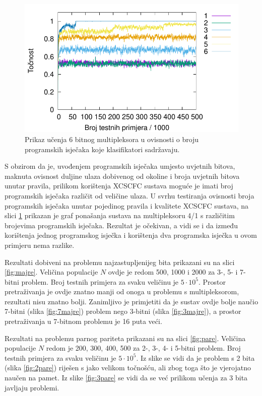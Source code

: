 \documentclass[times, utf8, zavrsni]{fer}
\begin{document}
\begin{figure}[!h]
    \centering
    \includegraphics[width=12cm]{img/mux_cond/6bitcond.pdf}
    \caption{Prikaz učenja 6 bitnog multipleksora u ovisnosti o broju programskih isječaka koje klasifikatori sadržavaju.}
    \label{img:6bitcond}
\end{figure}
S obzirom da je, uvođenjem programskih isječaka umjesto uvjetnih bitova, maknuta ovisnost duljine ulaza dobivenog od okoline i broja uvjetnih bitova unutar pravila, prilikom korištenja XCSCFC sustava moguće je imati broj programskih isječaka različit od veličine ulaza.
U svrhu testiranja ovisnosti broja programskih isječaka unutar pojedinog pravila i kvalitete XCSCFC sustava, na slici \ref{img:6bitcond} prikazan je graf ponašanja sustava na multipleksoru 4/1 s različitim brojevima programskih isječaka.
Rezultat je očekivan, a vidi se i da između korištenja jednog programskog isječka i korištenja dva programska isječka u ovom primjeru nema razlike.

Rezultati dobiveni na problemu najzastupljenijeg bita prikazani su na slici \ref{fig:majre}.
Veličina populacije $N$ ovdje je redom 500, 1000 i 2000 za 3-, 5- i 7-bitni problem.
Broj testnih primjera za svaku veličinu je $5 \cdot 10^{5}$.
Prostor pretraživanja je ovdje znatno manji od onoga u problemu s multipleksorom, rezultati nisu znatno bolji.
Zanimljivo je primjetiti da je sustav ovdje bolje naučio 7-bitni (slika \ref{fig:7majre}) problem nego 3-bitni (slika \ref{fig:3majre}), a prostor pretraživanja u 7-bitnom problemu je 16 puta veći.

Rezultati na problemu parnog pariteta prikazani su na slici \ref{fig:pare}.
Veličina populacije $N$ redom je 200, 300, 400, 500 za 2-, 3-, 4- i 5-bitni problem.
Broj testnih primjera za svaku veličinu je $5 \cdot 10^{5}$.
Iz slike se vidi da je problem s 2 bita (slika \ref{fig:2pare}) riješen s jako velikom točnošću, ali zbog toga što je vjerojatno naučen na pamet.
Iz slike \ref{fig:3pare} se vidi da se već prilikom učenja za 3 bita javljaju problemi.
\end{document}
